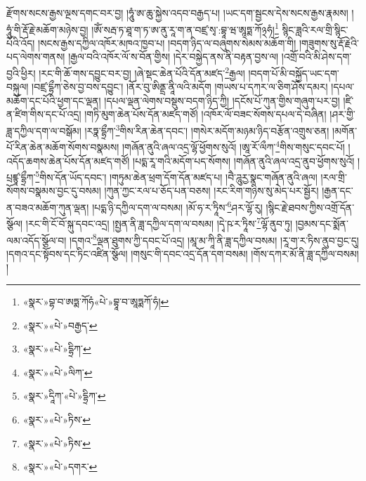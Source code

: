 རྫོགས་སངས་རྒྱས་ལྔས་དགང་བར་བྱ། །ཧཱུཾ་ཨ་ཆུ་སྐྱེས་འདབ་བརྒྱད་པ། །ཡང་དག་སྦྱངས་དེས་སངས་རྒྱས་རྣམས། །ཧཱུཾ་གི་རྡོ་རྗེ་མཆོག་མཉེས་བྱ། །ཨོཾ་སརྦ་ཏ་ཐཱ་ག་ཏ་ཨ་ནུ་རཱ་ག་ན་བཛྲ་སྭ་:བྷཱ་ཝ་ཨཱཏྨ་ཀོ྅ཧཾ།\footnote{«སྣར་»བྷ་བ་ཨཏྨ་ཀོཧཾ«པེ་»བྷཱ་བ་ཨཱཏྨཀོ་ཧཾ།} སྙིང་ཟླའི་རལ་གྲི་སྙིང་པོའི་འོད། །སངས་རྒྱས་དཀྱིལ་འཁོར་མཁའ་ཁྱབ་པ། །བདག་ཉིད་ལ་བཞུགས་སེམས་མཆོག་གི། །གཟུགས་སུ་རྡོ་རྗེའི་པད་ལེགས་གནས། །རྒྱལ་བའི་འཁོར་ལོ་ས་བོན་གྱིས། །དེར་བསྐྱེད་ནས་ནི་བརྟན་བྱས་ལ། །འགྲོ་བའི་མི་ཤེས་དག་བྱའི་ཕྱིར། །རང་གི་ཆོ་གས་དབྱུང་བར་བྱ། །ཞེ་སྡང་ཆེན་པོའི་དོན་མཛད་\footnote{«སྣར་»«པེ་»བརྒྱད་}རྒྱལ། །བདག་པོ་མི་བསྐྱོད་ཡང་དག་བསྐུལ། །བཛྲ་དྷྲྀཀ་ཅེས་བྱ་བས་དབྱུང་། །ནོར་བུ་ཨིནྡྲ་ནཱི་ལའི་མདོག །གཡས་པ་དཀར་ལ་ཅིག་ཤོས་དམར། །དཔལ་མཆོག་དང་པོའི་ཕྱག་དང་ལྡན། །དཔལ་ལྡན་ལེགས་བསྡུས་བདག་ཉིད་ཀྱི། །དངོས་པོ་ཀུན་གྱིས་གཞུག་པར་བྱ། །ཛི་ན་ཛིག་གིས་དང་པོ་འདྲ། །གཏི་མུག་ཆེན་པོས་དོན་མཛད་གཙོ། །འཁོར་ལོ་བཟང་སོགས་དཔལ་དེ་བཞིན། །ཤར་གྱི་ཟླ་དཀྱིལ་དག་ལ་བསྒོམ། །རཏྣ་དྷྲྀཀ་\footnote{«སྣར་»«པེ་»དྷྲིཀ་}གིས་རིན་ཆེན་དབང་། །གསེར་མདོག་མཉམ་ཉིད་བརྩོན་འགྲུས་ཅན། །མགོན་པོ་རིན་ཆེན་མཆོག་སོགས་བསྣམས། །གཞོན་ནུའི་ཞལ་འདྲ་ལྷོ་ཕྱོགས་སུའོ། །ཨཱ་རོ་ལྀཀ་\footnote{«སྣར་»«པེ་»ལིཀ་}གིས་གསུང་དབང་པོ། །འདོད་ཆགས་ཆེན་པོས་དོན་མཛད་གཙོ། །པདྨ་རཱ་གའི་མདོག་པད་སོགས། །གཞོན་ནུའི་ཞལ་འདྲ་ནུབ་ཕྱོགས་སུའོ། །པྲཛྙཱ་དྷྲྀཀ་\footnote{«སྣར་»དཱིཀ་«པེ་»དྷྲིཀ་}གིས་དོན་ཡོད་དབང་། །གཏུམ་ཆེན་ཕྲག་དོག་དོན་མཛད་པ། །བཻ་ཌཱུརྱ་སྣང་གཞོན་ནུའི་ཞལ། །རལ་གྲི་སོགས་བསྣམས་བྱང་དུ་བསམ། །ཀུན་ཀྱང་རལ་པ་ཅོད་པན་བཅས། །རང་རིག་གཉིས་སུ་མེད་པར་སྦྱོར། །རྒྱན་དང་ན་བཟའ་མཆོག་ཀུན་ལྡན། །པདྨ་ཉི་དཀྱིལ་དག་ལ་བསམ། །མོ་ཧ་ར་ཏཱིས་\footnote{«སྣར་»«པེ་»ཏིས་}ཤར་ལྷོ་རུ། །སྙིང་རྗེ་ཐབས་ཀྱིས་འགྲོ་དོན་སྩོལ། །རང་གི་ངོ་བོ་སྐུ་དབང་འདྲ། །སྤྱན་ནི་ཟླ་དཀྱིལ་དག་ལ་བསམ། །དྭེ་ཥ་ར་ཏཱིས་\footnote{«སྣར་»«པེ་»ཏིས་}ལྷོ་ནུབ་ཏུ། །བྱམས་དང་སྨོན་ལམ་འདོད་སྩོལ་བ། །དགའ་\footnote{«སྣར་»«པེ་»དགར་}ལྡན་ཐུགས་ཀྱི་དབང་པོ་འདྲ། །མཱ་མ་ཀཱི་ནི་ཟླ་དཀྱིལ་བསམ། །རཱ་ག་ར་ཏིས་ནུབ་བྱང་དུ། །དགའ་དང་སྟོབས་དང་ཏིང་འཛིན་སྩོལ། །གསུང་གི་དབང་འདྲ་དོན་དག་བསམ། །གོས་དཀར་མོ་ནི་ཟླ་དཀྱིལ་བསམ། །

